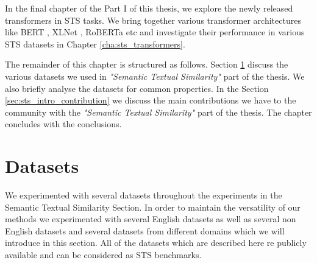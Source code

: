 In the final chapter of the Part I of this thesis, we explore the newly released transformers in STS tasks. We bring together various transformer architectures like BERT \cite{devlin-etal-2019-bert}, XLNet \cite{yang2019xlnet}, RoBERTa \cite{liu2019roberta} etc and investigate their performance in various STS datasets in Chapter \ref{cha:sts_transformers}. 

The remainder of this chapter is structured as follows. Section \ref{sec:sts_intro_datsets} discuss the various datasets we used in \textit{"Semantic Textual Similarity"} part of the thesis. We also briefly analyse the datasets for common properties. In the Section \ref{sec:sts_intro_contribution} we discuss the main contributions we have to the community with the \textit{"Semantic Textual Similarity"} part of the thesis. The chapter concludes with the conclusions.


\section{Datasets}
\label{sec:sts_intro_datsets}
We experimented with several datasets throughout the experiments in the Semantic Textual Similarity Section. In order to maintain the versatility of our methods we experimented with several English datasets as well as several non English datasets and several datasets from different domains which we will introduce in this section. All of the datasets which are described here re publicly available and can be considered as STS benchmarks. 

